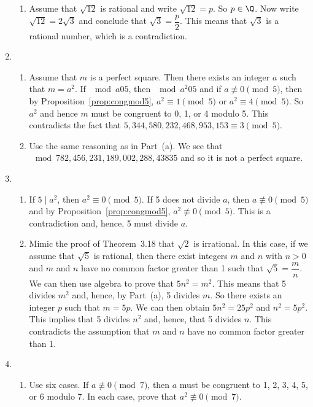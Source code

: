 \begin{enumerate}
\begin{enumerate}
\item Assume that $\sqrt{12}$ is rational and write $\sqrt{12} = p$.  So $p \in \Q$.  Now write 
$\sqrt{12} = 2 \sqrt{3}$ and conclude that $\sqrt{3} = \dfrac{p}{2}$.  This means that $\sqrt{3}$ is a rational number, which is a contradiction.
\end{enumerate}


\item  \begin{enumerate}
\item Assume that $m$ is a perfect square.  Then there exists an integer $a$ such that $m = a^2$.  If $\mod{a}{0}{5}$, then $\mod{a^2}{0}{5}$ and if $a \not\equiv 0 \pmod 5$, then by Proposition~\ref{prop:congmod5},  
 $a^2 \equiv 1 \pmod 5$ or $a^2 \equiv 4 \pmod 5$.  So $a^2$ and hence $m$ must be congruent to 0, 1, or 4 modulo 5.  This contradicts the fact that $5,344,580,232,468,953,153 \equiv 3 \pmod 5$.

\item Use the same reasoning as in Part~(a).  We see that \\$\mod{782,456,231,189,002,288,438}{3}{5}$ and so it is not a perfect square.
\end{enumerate}






\item \begin{enumerate}
\item If $5 \mid a^2$, then $a^2 \equiv 0 \pmod 5$.  If 5 does not divide $a$, then 
$a \not\equiv 0 \pmod 5$ and by Proposition~\ref{prop:congmod5}, $a^2 \not\equiv 0 \pmod 5$.  This is a contradiction and, hence, 5 must divide $a$.

\item Mimic the proof of Theorem~3.18 that $\sqrt{2}$ is irrational.  In this case, if we assume that $\sqrt{5}$ is rational, then there exist integers $m$ and $n$ with $n > 0$ and $m$ and $n$ have no common factor greater than 1 such that $\sqrt{5} = \dfrac{m}{n}$.  We can then use algebra to prove that $5n^2 = m^2$.  This means that 5 divides $m^2$ and, hence, by Part~(a), 5 divides $m$.  So there exists an integer $p$ such that $m = 5p$.  We can then obtain $5n^2 = 25p^2$ and $n^2 = 5p^2$.  This implies that 5 divides $n^2$ and, hence, that 5 divides $n$.  This contradicts the assumption that $m$ and $n$ have no common factor greater than 1.
\end{enumerate}


\item \begin{enumerate}
\item Use six cases.  If $a \not\equiv 0 \pmod 7$, then $a$ must be congruent to 1, 2, 3, 4, 5, or 6 modulo 7.  In each case, prove that $a^2 \not\equiv 0 \pmod 7$.


\end{enumerate}
\end{enumerate}

